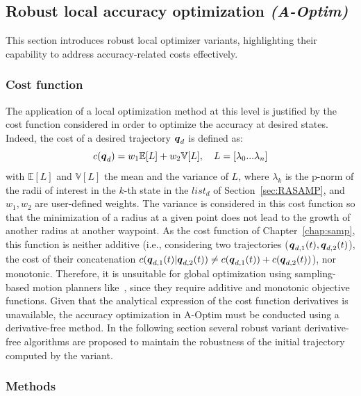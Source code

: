 \subsection{Robust local accuracy optimization \emph{(A-Optim)} }\label{sec:AOptim}

This section introduces robust local optimizer variants, highlighting their capability to address accuracy-related costs effectively.

\subsubsection{Cost function}

The application of a local optimization method at this level is justified by the cost function considered in order to optimize the accuracy at desired states. 
Indeed, the cost of a desired trajectory $\boldsymbol{q}_d$ is defined as:
\begin{equation}\label{eq: cost}
    c(\boldsymbol{q}_d) = w_1\mathbb{E}[L] + w_2\mathbb{V}[L], \quad L = \left[\lambda_{0} ... \lambda_n \right]
\end{equation}
with $\mathbb{E}[L]$ and $\mathbb{V}[L]$ the mean and the variance of $L$, where $\lambda_k$ is the p-norm of the radii of interest in the $k$-th state in the $list_{d}$ of Section~\ref{sec:RASAMP}, and $w_1, w_2$ are user-defined weights.
The variance is considered in this cost function so that the minimization of a radius at a given point does not lead to the growth of another radius at another waypoint.
As the cost function of Chapter~\ref{chap:samp}, this function is neither additive (i.e., considering two trajectories ($\boldsymbol{q}_{d,1}(t), \boldsymbol{q}_{d,2}(t)$), the cost of their concatenation $c(\boldsymbol{q}_{d,1}(t)|\boldsymbol{q}_{d,2}(t)) \neq c(\boldsymbol{q}_{d,1}(t)) + c(\boldsymbol{q}_{d,2}(t))$), nor monotonic. 
Therefore, it is unsuitable for global optimization using sampling-based motion planners like~\cite{cRRT,cRRTstar}, since they require additive and monotonic objective functions.
Given that the analytical expression of the cost function derivatives is unavailable, the accuracy optimization in A-Optim must be conducted using a derivative-free method.
In the following section several robust variant derivative-free algorithms are proposed to maintain the robustness of the initial trajectory computed by the  variant.

\subsubsection{Methods}

